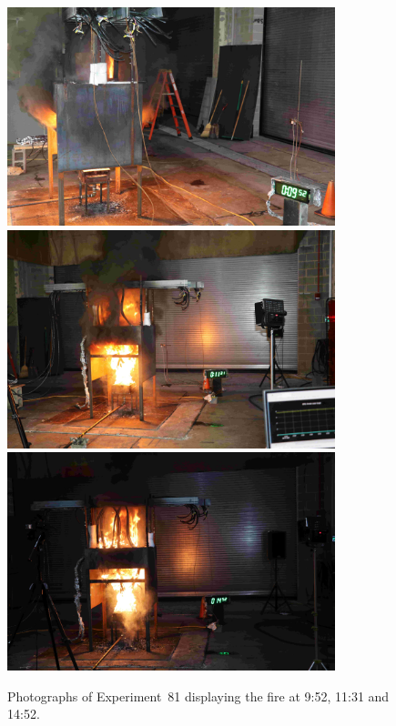 \begin{figure}[p]
\centering
\includegraphics[height=2.50in]{../FIGURES/Test_81_Photo_1} \\ \vspace{0.1in}
\includegraphics[height=2.50in]{../FIGURES/Test_81_Photo_2} \\ \vspace{0.1in}
\includegraphics[height=2.50in]{../FIGURES/Test_81_Photo_3}
\caption[Photographs of Experiment~81]{Photographs of Experiment~81 displaying the fire at 9:52, 11:31 and 14:52.}
\label{fig:Test_81_photos}
\end{figure}


\clearpage

